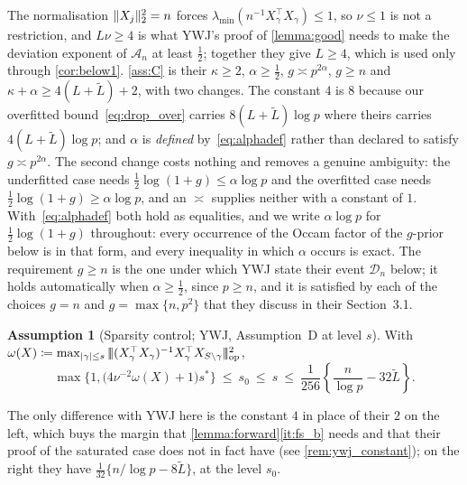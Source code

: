 \documentclass[aos]{imsart}
\DeclarePairedDelimiter{\norm}{\lVert}{\rVert}
\DeclarePairedDelimiter{\abs}{\lvert}{\rvert}
\newcommand{\opnorm}[1]{|\!|\!|#1|\!|\!|_{\mathrm{op}}}
\newcommand{\Ltil}{\widetilde{L}}
\theoremstyle{plain}
\theoremstyle{definition}
\newtheorem{assumption}{Assumption}[section]
\begin{document}
    The normalisation $\norm{X_j}_2^{2}=n$ forces
    $\lambda_{\min}(n^{-1}X_\gamma^{\top}X_\gamma)\leq1$, so $\nu\leq1$ is
    not a restriction, and $L\nu\geq4$ is what YWJ's proof of
    \cref{lemma:good} needs to make the deviation exponent of
    $\mathcal{A}_n$ at least $\tfrac12$; together they give $L\geq4$, which
    is used only through \cref{cor:below1}. \cref{ass:C} is their
    $\kappa\geq2$, $\alpha\geq\tfrac12$, $g\asymp p^{2\alpha}$, $g\geq n$
    and $\kappa+\alpha\geq4(L+\Ltil)+2$, with two changes. The constant
    $4$ is $8$ because our overfitted bound~\eqref{eq:drop_over} carries
    $8(L+\Ltil)\log p$ where theirs carries $4(L+\Ltil)\log p$; and
    $\alpha$ is \emph{defined} by~\eqref{eq:alphadef} rather than declared
    to satisfy $g\asymp p^{2\alpha}$. The second change costs nothing and
    removes a genuine ambiguity: the underfitted case needs
    $\tfrac12\log(1+g)\leq\alpha\log p$ and the overfitted case needs
    $\tfrac12\log(1+g)\geq\alpha\log p$, and an $\asymp$ supplies neither
    with a constant of $1$. With~\eqref{eq:alphadef} both hold as
    equalities, and we write $\alpha\log p$ for $\tfrac12\log(1+g)$
    throughout: every occurrence of the Occam factor of the $g$-prior below
    is in that form, and every inequality in which $\alpha$ occurs is
    exact. The requirement $g\geq n$ is the one under which YWJ state their
    event $\mathcal{D}_n$ below; it holds automatically when
    $\alpha\geq\tfrac12$, since $p\geq n$, and it is satisfied by each of
    the choices $g=n$ and $g=\max\{n,p^{2}\}$ that they discuss in their
    Section~3.1.

    \begin{assumption}[Sparsity control; YWJ, Assumption~D at level $s$]
        \label{ass:D}
        With
        $\omega(X)\coloneq\max_{\abs \gamma\leq s}
        \opnorm{(X_\gamma^{\top}X_\gamma)^{-1}X_\gamma^{\top}
            X_{S\setminus\gamma}}^{2}$,
        \begin{equation}
            \label{eq:Dassumption}
            \max\{1, \bigl(4\nu^{-2}\omega(X)+1\bigr)s^{\ast}\}
            \ \leq\ s_0\ \leq\ s\ \leq\
            \frac{1}{256}\left\{\frac{n}{\log p}-32\Ltil\right\} .
        \end{equation}
    \end{assumption}

    The only difference with YWJ here is the constant $4$ in place of their
    $2$ on the left, which buys the margin that
    \cref{lemma:forward}\ref{it:fs_b} needs and that their proof of the
    saturated case does not in fact have (see \cref{rem:ywj_constant}); on
    the right they have $\tfrac1{32}\{n/\log p-8\Ltil\}$, at the level $s_0$.
\end{document}
